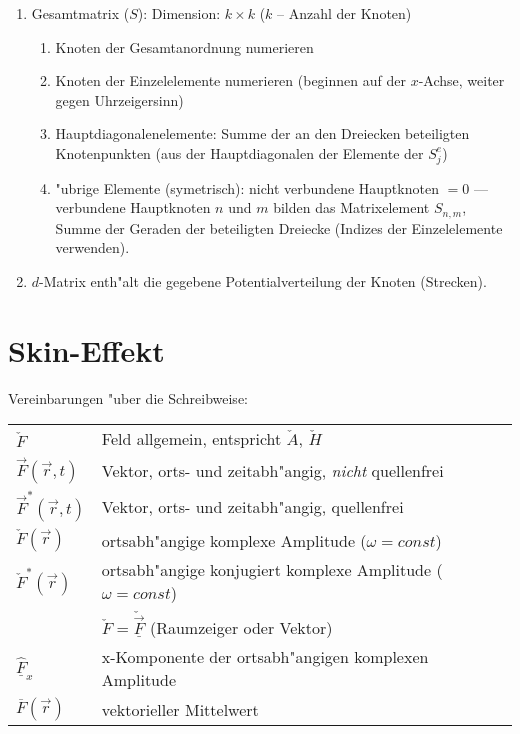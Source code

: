 \begin{description}
\begin{enumerate}
         \item Gesamtmatrix ($S$): Dimension: $k\times k$ ($k$ -- Anzahl der Knoten)
         \begin{enumerate}
         \item Knoten der Gesamtanordnung numerieren
         \item Knoten der Einzelelemente numerieren (beginnen auf der $x$-Achse,
               weiter gegen Uhrzeigersinn)
         \item Hauptdiagonalenelemente: Summe der an den Dreiecken beteiligten
               Knotenpunkten (aus der Hauptdiagonalen der Elemente der $S_j^e$)
         \item "ubrige Elemente (symetrisch): nicht verbundene Hauptknoten $=0$
               --- verbundene Hauptknoten $n$ und $m$ bilden das Matrixelement
               $S_{n,m}$, Summe der Geraden der beteiligten Dreiecke (Indizes
               der Einzelelemente verwenden).
         \end{enumerate}
         \item $d$-Matrix enth"alt die gegebene Potentialverteilung der Knoten
               (Strecken).
   \end{enumerate}
\end{description}
\clearpage \section{Skin-Effekt}
Vereinbarungen "uber die Schreibweise:

\begin{tabular*}{\textwidth}{l@{\extracolsep\fill}p{13cm}}
$\check{F}$&Feld allgemein, entspricht $\check{A}$, $\check{H}$\\
$\vec{F}(\vec{r},t)$&Vektor, orts- und zeitabh"angig, {\it nicht}\/ quellenfrei\\
$\vec{F}^{\ast}(\vec{r},t)$&Vektor, orts- und zeitabh"angig, quellenfrei\\
$\check{F}(\vec{r})$&ortsabh"angige komplexe Amplitude ($\omega=const$)\\
$\check{F}^{\ast}(\vec{r})$&ortsabh"angige konjugiert komplexe Amplitude
      ($\omega=const$)\\
      &$\check{F}=\underline{\check{\vec{F}}}$ (Raumzeiger oder Vektor)\\
$\underline{\hat{F}}_x$&x-Komponente der ortsabh"angigen komplexen Amplitude\\
$\overline{F}(\vec{r})$&vektorieller Mittelwert\\
\end{tabular*}


